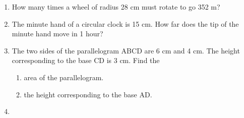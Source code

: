 \begin{enumerate}[label=\thesection.\arabic*, ref=\thesection.\theenumi]
\item How many times a wheel of radius 28 cm must rotate to go 352 m? 
\item The minute hand of a circular clock is 15 cm.
	How far does the tip of the minute hand move in 1 hour? 
\item The two sides of the parallelogram ABCD are 6 cm and 4 cm. The height corresponding to the base CD is 3 cm. Find the
	\begin{enumerate}
\item 	area of the parallelogram. 
\item the height corresponding to the base AD.
\end{enumerate}
\item 		\end{enumerate}

